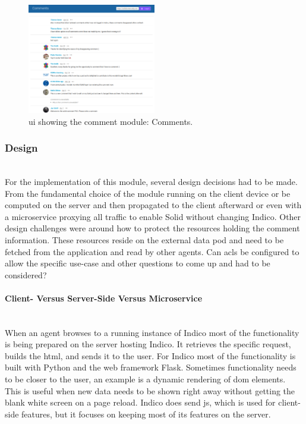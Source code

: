 \begin{figure}[ht!]
    \centering
    \includegraphics[width=0.5\textwidth]{prototype/poc-solid-comment-comments.png}
    \caption{\gls{ui} showing the comment module: Comments.}
    \label{fig:poc-solid-comment-comments}
\end{figure}

\subsubsection{Design}\label{subsubsection:design}\mbox{}\\

For the implementation of this module, several design decisions had to be made. From the fundamental choice of the module running on the client device or be computed on the server and then propagated to the client afterward or even with a microservice proxying all traffic to enable Solid without changing Indico.
Other design challenges were around how to protect the resources holding the comment information. These resources reside on the external data pod and need to be fetched from the application and read by other agents. Can \glspl{acl} be configured to allow the specific use-case and other questions to come up and had to be considered?
\vspace{0.5cm}
\paragraph{Client- Versus Server-Side Versus Microservice}\mbox{}\\

When an agent browses to a running instance of Indico most of the functionality is being prepared on the server hosting Indico. It retrieves the specific request, builds the \gls{html}, and sends it to the user. For Indico most of the functionality is built with Python and the web framework Flask. Sometimes functionality needs to be closer to the user, an example is a dynamic rendering of \gls{dom} elements. This is useful when new data needs to be shown right away without getting the blank white screen on a page reload.
Indico does send \gls{js}, which is used for client-side features, but it focuses on keeping most of its features on the server.

